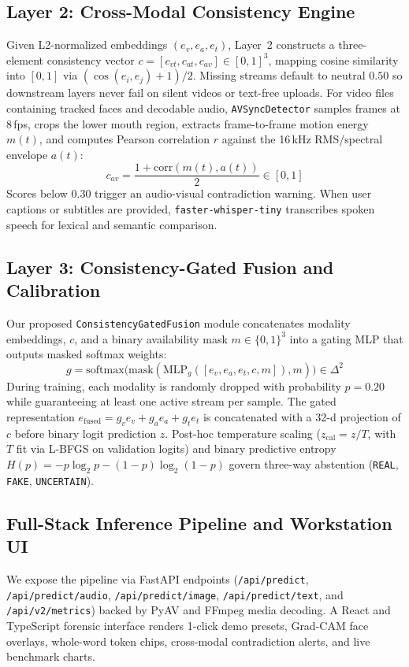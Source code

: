 \documentclass[conference]{IEEEtran}
\begin{document}
\subsection{Layer 2: Cross-Modal Consistency Engine}
Given L2-normalized embeddings $(e_v, e_a, e_t)$, Layer~2 constructs a three-element consistency vector $c = [c_{vt}, c_{at}, c_{av}] \in [0, 1]^3$, mapping cosine similarity into $[0,1]$ via $(\cos(e_i, e_j) + 1)/2$. Missing streams default to neutral $0.50$ so downstream layers never fail on silent videos or text-free uploads. For video files containing tracked faces and decodable audio, \texttt{AVSyncDetector} samples frames at 8\,fps, crops the lower mouth region, extracts frame-to-frame motion energy $m(t)$, and computes Pearson correlation $r$ against the 16\,kHz RMS/spectral envelope $a(t)$:
\begin{equation}
c_{av} = \frac{1 + \text{corr}(m(t), a(t))}{2} \in [0, 1]
\end{equation}
Scores below $0.30$ trigger an audio-visual contradiction warning. When user captions or subtitles are provided, \texttt{faster-whisper-tiny} transcribes spoken speech for lexical and semantic comparison.

\subsection{Layer 3: Consistency-Gated Fusion and Calibration}
Our proposed \texttt{ConsistencyGatedFusion} module concatenates modality embeddings, $c$, and a binary availability mask $m \in \{0,1\}^3$ into a gating MLP that outputs masked softmax weights:
\begin{equation}
g = \text{softmax}\big(\text{mask}(\text{MLP}_g([e_v, e_a, e_t, c, m]), m)\big) \in \Delta^2
\end{equation}
During training, each modality is randomly dropped with probability $p = 0.20$ while guaranteeing at least one active stream per sample. The gated representation $e_{\text{fused}} = g_v e_v + g_a e_a + g_t e_t$ is concatenated with a 32-d projection of $c$ before binary logit prediction $z$. Post-hoc temperature scaling ($z_{\text{cal}} = z / T$, with $T$ fit via L-BFGS on validation logits) and binary predictive entropy $H(p) = -p\log_2 p - (1-p)\log_2(1-p)$ govern three-way abstention (\texttt{REAL}, \texttt{FAKE}, \texttt{UNCERTAIN}).

\subsection{Full-Stack Inference Pipeline and Workstation UI}
We expose the pipeline via FastAPI endpoints (\texttt{/api/predict}, \texttt{/api/predict/audio}, \texttt{/api/predict/image}, \texttt{/api/predict/text}, and \texttt{/api/v2/metrics}) backed by PyAV and FFmpeg media decoding. A React and TypeScript forensic interface renders 1-click demo presets, Grad-CAM face overlays, whole-word token chips, cross-modal contradiction alerts, and live benchmark charts.
\end{document}
